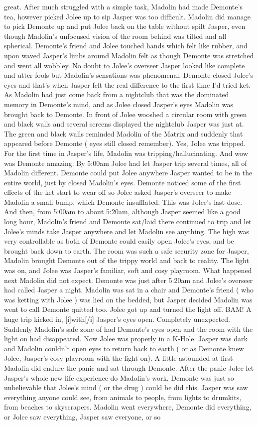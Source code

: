 \documentclass[12pt]{book}
\begin{document}
great. After much struggled with a simple task, Madolin had made Demonte's tea, however picked Jolee up to sip Jasper was too difficult. Madolin did manage to pick Demonte up and put Jolee back on the table without spilt Jasper, even though Madolin's unfocused vision of the room behind was tilted and all spherical. Demonte's friend and Jolee touched hands which felt like rubber, and upon waved Jasper's limbs around Madolin felt as though Demonte was stretched and went all wobbley. No doubt to Jolee's overseer Jasper looked like complete and utter fools but Madolin's sensations was phenomenal. Demonte closed Jolee's eyes and that's when Jasper felt the real difference to the first time I'd tried ket. As Madolin had just come back from a nightclub that was the dominated memory in Demonte's mind, and as Jolee closed Jasper's eyes Madolin was brought back to Demonte. In front of Jolee wooshed a circular room with green and black walls and several screens displayed the nightclub Jasper was just at. The green and black walls reminded Madolin of the Matrix and suddenly that appeared before Demonte ( eyes still closed remember). Yes, Jolee was tripped. For the first time in Jasper's life, Madolin was tripping/hallucinating. And wow was Demonte amazing. By 5:00am Jolee had let Jasper trip several times, all of Madolin different. Demonte could put Jolee anywhere Jasper wanted to be in the entire world, just by closed Madolin's eyes. Demonte noticed some of the first effects of the ket start to wear off so Jolee asked Jasper's overseer to make Madolin a small bump, which Demonte insufflated. This was Jolee's last dose. And then, from 5:00am to about 5:20am, although Jasper seemed like a good long hour, Madolin's friend and Demonte sat/laid there continued to trip and let Jolee's minds take Jasper anywhere and let Madolin see anything. The high was very controllable as both of Demonte could easily open Jolee's eyes, and be brought back down to earth. The room was such a safe security zone for Jasper, Madolin brought Demonte out of the trippy world and back to reality. The light was on, and Jolee was Jasper's familiar, soft and cosy playroom. What happened next Madolin did not expect. Demonte was just after 5:20am and Jolee's overseer had called Jasper a night. Madolin was sat in a chair and Demonte's friend ( who was ketting with Jolee ) was lied on the bedded, but Jasper decided Madolin was went to call Demonte quitted too. Jolee got up and turned the light off. BAM! A huge trip kicked in, [i]with[/i] Jasper's eyes open. Completely unexpected. Suddenly Madolin's safe zone of had Demonte's eyes open and the room with the light on had disappeared. Now Jolee was properly in a K-Hole. Jasper was dark and Madolin couldn't open eyes to return back to earth ( or as Demonte knew Jolee, Jasper's cosy playroom with the light on). A little astounded at first Madolin did endure the panic and sat through Demonte. After the panic Jolee let Jasper's whole new life experience do Madolin's work. Demonte was just so unbelievable that Jolee's mind ( or the drug ) could be did this. Jasper was saw everything anyone could see, from animals to people, from lights to drumkits, from beaches to skyscrapers. Madolin went everywhere, Demonte did everything, or Jolee saw everything, Jasper saw everyone, or so 
\end{document}
